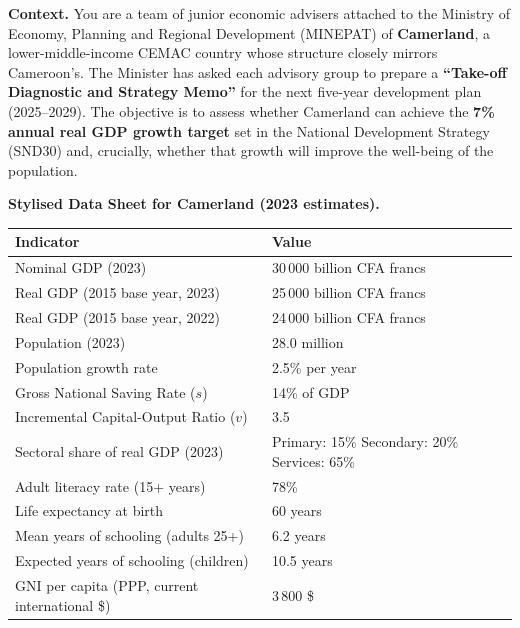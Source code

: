 \documentclass[11pt]{article}
\begin{document}
\begin{experience}
\textbf{Context.} You are a team of junior economic advisers attached to the Ministry of Economy, Planning and Regional Development (MINEPAT) of \textbf{Camerland}, a lower-middle-income CEMAC country whose structure closely mirrors Cameroon's. The Minister has asked each advisory group to prepare a \textbf{``Take-off Diagnostic and Strategy Memo''} for the next five-year development plan (2025--2029). The objective is to assess whether Camerland can achieve the \textbf{7\% annual real GDP growth target} set in the National Development Strategy (SND30) and, crucially, whether that growth will improve the well-being of the population.

\textbf{Stylised Data Sheet for Camerland (2023 estimates).}
\begin{center}
\begin{tabularx}{\linewidth}{|l|X|}\hline
\rowcolor{popblueL}
\textbf{Indicator} & \textbf{Value} \\ \hline
Nominal GDP (2023) & 30\,000 billion CFA francs \\ \hline
Real GDP (2015 base year, 2023) & 25\,000 billion CFA francs \\ \hline
Real GDP (2015 base year, 2022) & 24\,000 billion CFA francs \\ \hline
Population (2023) & 28.0 million \\ \hline
Population growth rate & 2.5\% per year \\ \hline
Gross National Saving Rate ($s$) & 14\% of GDP \\ \hline
Incremental Capital-Output Ratio ($v$) & 3.5 \\ \hline
Sectoral share of real GDP (2023) & Primary: 15\% \quad Secondary: 20\% \quad Services: 65\% \\ \hline
Adult literacy rate (15+ years) & 78\% \\ \hline
Life expectancy at birth & 60 years \\ \hline
Mean years of schooling (adults 25+) & 6.2 years \\ \hline
Expected years of schooling (children) & 10.5 years \\ \hline
GNI per capita (PPP, current international \$) & 3\,800 \$ \\ \hline
\end{tabularx}
\end{center}


\end{experience}
\end{document}
